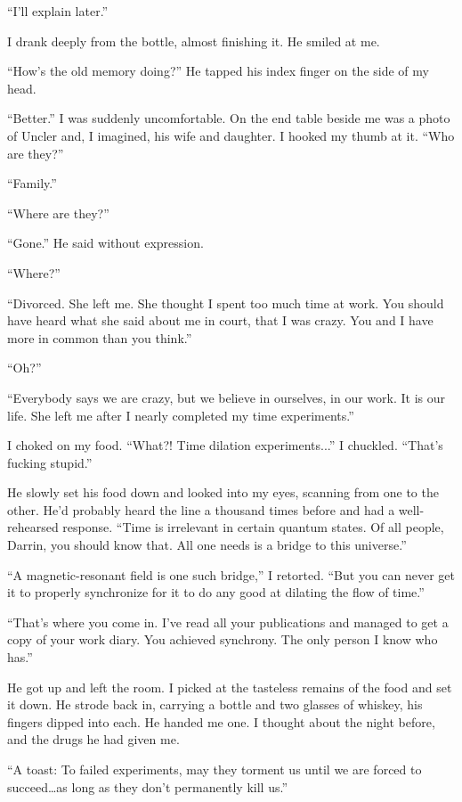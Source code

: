 \documentclass[
]{article}
\begin{document}
``I'll explain later.''

I drank deeply from the bottle, almost finishing it. He smiled at me.

``How's the old memory doing?'' He tapped his index finger on the side
of my head.

``Better.'' I was suddenly uncomfortable. On the end table beside me was
a photo of Uncler and, I imagined, his wife and daughter. I hooked my
thumb at it. ``Who are they?''

``Family.''

``Where are they?''

``Gone.'' He said without expression.

``Where?''

``Divorced. She left me. She thought I spent too much time at work. You
should have heard what she said about me in court, that I was crazy. You
and I have more in common than you think.''

``Oh?''

``Everybody says we are crazy, but we believe in ourselves, in our work.
It is our life. She left me after I nearly completed my time
experiments.''

I choked on my food. ``What?! Time dilation experiments...'' I chuckled.
``That's fucking stupid.''

He slowly set his food down and looked into my eyes, scanning from one
to the other. He'd probably heard the line a thousand times before and
had a well-rehearsed response. ``Time is irrelevant in certain quantum
states. Of all people, Darrin, you should know that. All one needs is a
bridge to this universe.''

``A magnetic-resonant field is one such bridge,'' I retorted. ``But you
can never get it to properly synchronize for it to do any good at
dilating the flow of time.''

``That's where you come in. I've read all your publications and managed
to get a copy of your work diary. You achieved synchrony. The only
person I know who has.''

He got up and left the room. I picked at the tasteless remains of the
food and set it down. He strode back in, carrying a bottle and two
glasses of whiskey, his fingers dipped into each. He handed me one. I
thought about the night before, and the drugs he had given me.

``A toast: To failed experiments, may they torment us until we are
forced to succeed\ldots as long as they don't permanently kill us.''
\end{document}
